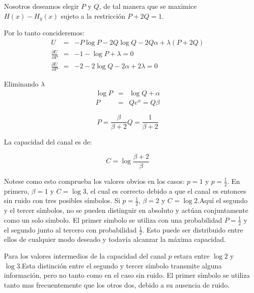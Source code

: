 Nosotros deseamos elegir $P$ y $Q$, de tal manera que se maximice
$H(x) - H_y(x)$ sujeto a la restricci\'on $P + 2Q = 1$.

Por lo tanto concideremos:
\begin{equation}
\begin{array}{rcl}
U &=& -P\log{P} - 2Q\log{Q} -2Q\alpha + \lambda(P+2Q) \\
\frac{{\partial U}}{{\partial P}} &=& -1 - \log{P} + \lambda = 0 \\
\frac{{\partial U}}{{\partial P}} &=& -2 - 2\log{Q} -2\alpha + 2\lambda = 0
\end{array}
\end{equation}

Eliminando $\lambda$
\begin{equation}
\begin{array}{rcl}
\log{P} &=& \log{Q} + \alpha \\
P &=& Q e^\alpha = Q\beta 
\end{array}
\end{equation}

\begin{equation}
	P = \frac{\beta}{\beta + 2}   Q = \frac{1}{\beta + 2}
\end{equation}

La capacidad del canal es de:

\begin{equation}
	C = \log{\frac{\beta + 2}{\beta}}
\end{equation}

Notese como esto comprueba los valores obvios en los casos: $p = 1$ y $p = \frac{1}{2}$. En primero, $\beta = 1$ y $C = \log{3}$, 
el cual es correcto debido a que el canal es entonces sin ruido con tres posibles s\'imbolos. Si $p = \frac{1}{2}$, $\beta = 2$ y 
$C = \log{2}$.Aqu\'i el segundo y el tercer s\'imbolos, no se pueden distinguir en absoluto y act\'uan conjuntamente como un solo 
s\'imbolo. El primer simbolo se utiliza con una probabilidad $P = \frac{1}{2}$  y el segundo junto al tercero con probabilidad $\frac{1}{2}$.
Esto puede ser distribuido entre ellos de cualquier modo deseado y todav\'ia alcanzar la m\'axima capacidad.

Para los valores intermedios de la capacidad del canal $p$ estara entre $\log{2}$ y $\log{3}$.Esta distinci\'on 
entre el segundo y tercer s\'imbolo transmite alguna informaci\'on, pero no tanto como en el caso sin ruido.
El primer s\'imbolo se utiliza tanto mas frecuentemente que los otros dos, debido a su ausencia de ruido.

